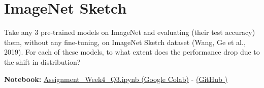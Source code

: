 \documentclass[12pt,a4paper]{article}
\begin{document}
\section{ImageNet Sketch}
Take any 3 pre-trained models on ImageNet and evaluating (their test accuracy) them, without any fine-tuning, on ImageNet Sketch dataset 
(Wang, Ge et al., 2019). For each of these models, to what extent does the performance drop due to the shift in distribution?

\textbf{Notebook:} \href{https://colab.research.google.com/drive/1iXdk22CjFKFREb8IFVXQX4Lbwdluaqp-?usp=sharing}{Assignment\_Week4\_Q3.ipynb (Google Colab)} - 
\href{https://github.com/bkhanal-11/ties411_cvip_jyu/blob/master/assignment4/src/Assignment_Week4_Q3.ipynb}{(GitHub \footnotemark[1])}
\end{document}
